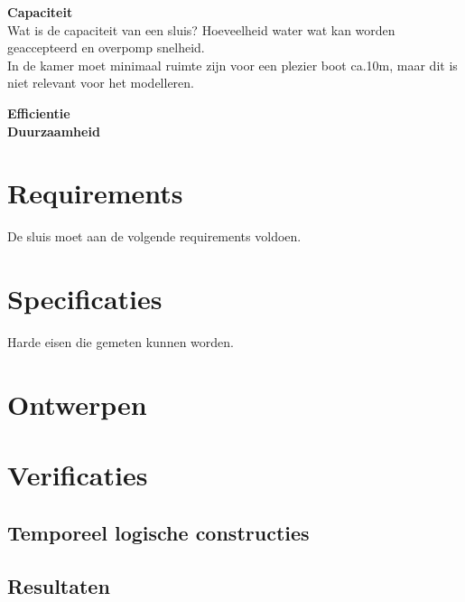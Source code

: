 \documentclass{article}
\begin{document}
\textbf{Capaciteit}\\
Wat is de capaciteit van een sluis? Hoeveelheid water wat kan worden geaccepteerd en overpomp snelheid.\\
In de kamer moet minimaal ruimte zijn voor een plezier boot ca.10m, maar dit is niet relevant voor het modelleren.

\textbf{Efficientie}\\

\textbf{Duurzaamheid}\\
\section{Requirements} %
De sluis moet aan de volgende requirements voldoen.

\section{Specificaties} %
Harde eisen die gemeten kunnen worden.

\section{Ontwerpen} %

\section{Verificaties}
\subsection{Temporeel logische constructies}
\subsection{Resultaten}



\clearpage

\newpage

\newpage


\end{document}

